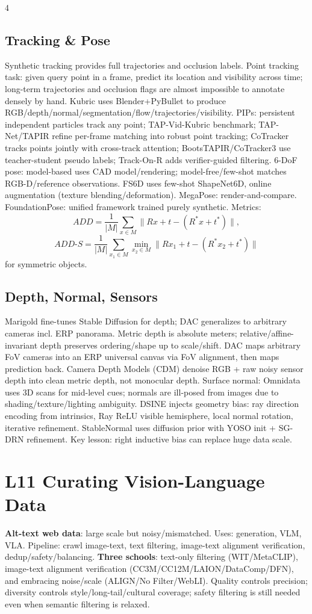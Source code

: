 \documentclass[8pt,a4paper,landscape]{extarticle}
\newcommand{\key}[1]{\textbf{#1}}
\begin{document}
\begin{multicols*}{4}
\subsection{Tracking \& Pose}
Synthetic tracking provides full trajectories and occlusion labels. Point tracking task: given query point in a frame, predict its location and visibility across time; long-term trajectories and occlusion flags are almost impossible to annotate densely by hand. Kubric uses Blender+PyBullet to produce RGB/depth/normal/segmentation/flow/trajectories/visibility. PIPs: persistent independent particles track any point; TAP-Vid-Kubric benchmark; TAP-Net/TAPIR refine per-frame matching into robust point tracking; CoTracker tracks points jointly with cross-track attention; BootsTAPIR/CoTracker3 use teacher-student pseudo labels; Track-On-R adds verifier-guided filtering.
6-DoF pose: model-based uses CAD model/rendering; model-free/few-shot matches RGB-D/reference observations. FS6D uses few-shot ShapeNet6D, online augmentation (texture blending/deformation). MegaPose: render-and-compare. FoundationPose: unified framework trained purely synthetic. Metrics:
\[
ADD=\frac1{|M|}\sum_{x\in M}\|Rx+t-(R^*x+t^*)\|,
\]
\[
ADD\text{-}S=\frac1{|M|}\sum_{x_1\in M}\min_{x_2\in M}\|Rx_1+t-(R^*x_2+t^*)\|
\]
for symmetric objects.

\subsection{Depth, Normal, Sensors}
Marigold fine-tunes Stable Diffusion for depth; DAC generalizes to arbitrary cameras incl. ERP panorama. Metric depth is absolute meters; relative/affine-invariant depth preserves ordering/shape up to scale/shift. DAC maps arbitrary FoV cameras into an ERP universal canvas via FoV alignment, then maps prediction back. Camera Depth Models (CDM) denoise RGB + raw noisy sensor depth into clean metric depth, not monocular depth. Surface normal: Omnidata uses 3D scans for mid-level cues; normals are ill-posed from images due to shading/texture/lighting ambiguity. DSINE injects geometry bias: ray direction encoding from intrinsics, Ray ReLU visible hemisphere, local normal rotation, iterative refinement. StableNormal uses diffusion prior with YOSO init + SG-DRN refinement. Key lesson: right inductive bias can replace huge data scale.

\section{L11 Curating Vision-Language Data}
\key{Alt-text web data}: large scale but noisy/mismatched. Uses: generation, VLM, VLA. Pipeline: crawl image-text, text filtering, image-text alignment verification, dedup/safety/balancing.
\key{Three schools}: text-only filtering (WIT/MetaCLIP), image-text alignment verification (CC3M/CC12M/LAION/DataComp/DFN), and embracing noise/scale (ALIGN/No Filter/WebLI). Quality controls precision; diversity controls style/long-tail/cultural coverage; safety filtering is still needed even when semantic filtering is relaxed.

\end{multicols*}
\end{document}
